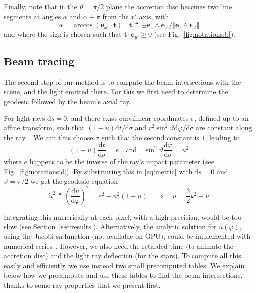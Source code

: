 \documentclass{document}
\newcommand{\diff}{\mathrm d}
\begin{document}
Finally, note that in the $\vartheta = \pi/2$ plane the accretion disc becomes 
two line segments at angles $\alpha$ and $\alpha + \pi$ from the $x'$ axis, with
\begin{equation}
\alpha = \arccos({\mathbf e}_{x'} \cdot {\mathbf t}) \quad
    {\mathbf t} \triangleq \pm{\mathbf e}_z\wedge{\mathbf e}_{z'} /
        \Vert {\mathbf e}_z \wedge {\mathbf e}_{z'} \Vert
\label{eq:alpha}
\end{equation}
and where the sign is chosen such that ${\mathbf t} \cdot {\mathbf e}_{y'} \ge 
0$ (see Fig.~\ref{fig:notations:b}).

\subsection{Beam tracing}\label{sec:beamtracing}

The second step of our method is to compute the beam intersections with the 
scene, and the light emitted there. For this we first need to determine the 
geodesic followed by the beam's axial ray.

For light rays $\diff s = 0$, and there exist curvilinear coordinates 
$\sigma$, defined up to an affine transform, such that $(1-u)\diff t / \diff 
\sigma$ and $r^2 \sin^2\vartheta \diff \varphi  /\diff \sigma$ are constant 
along the ray~\cite{weinberg1972}. We can thus choose $\sigma$ such that the 
second constant is $1$, leading to
\begin{equation}
(1 - u)\frac{\diff t}{\diff \sigma} = e \quad \mathrm{and} \quad
    \sin^2\vartheta \frac{\diff \varphi}{\diff \sigma} = u^2 
\label{eq:motionconstants}
\end{equation}
where $e$ happens to be the inverse of the ray's impact parameter (see 
Fig.~\ref{fig:notations:d}). By substituting this in \eqref{eq:metric} with 
$\diff s = 0$ and $\vartheta = \pi/2$ we get the geodesic equation
\begin{equation}
\dot{u}^2 \triangleq \left(\frac{\diff u}{\diff \varphi}\right)^2 
    = e^2 - u^2 (1 - u) \quad \Rightarrow \quad
\ddot{u} = \frac{3}{2} u^2 - u\label{eq:rayequation}
\end{equation}

Integrating this numerically at each pixel, with a high precision, would be too
slow (see Section~\ref{sec:results}). Alternatively, the analytic solution for 
$u(\varphi)$, using the Jacobi-sn function (not available on GPU), could be 
implemented with numerical series~\cite{Muller2012}. However, we also need the 
retarded time (to animate the accretion disc) and the light ray deflection (for 
the stars). To compute all this easily and efficiently, we use instead two 
small precomputed tables. We explain below how we precompute and use these 
tables to find the beam intersections, thanks to some ray properties that we 
present first.
\end{document}
